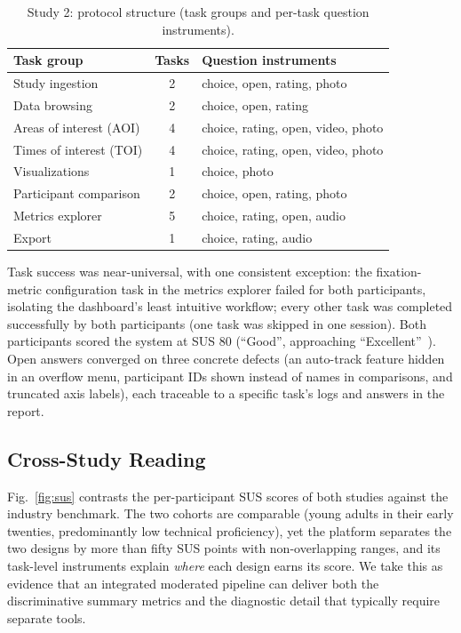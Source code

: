 \documentclass[conference]{IEEEtran}
\begin{document}
\begin{table}[t]
\caption{Study 2: protocol structure (task groups and per-task
question instruments).}
\label{tab:behold}
\centering
\footnotesize
\begin{tabular}{@{}lcl@{}}
\toprule
Task group & Tasks & Question instruments\\
\midrule
Study ingestion & 2 & choice, open, rating, photo\\
Data browsing & 2 & choice, open, rating\\
Areas of interest (AOI) & 4 & choice, rating, open, video, photo\\
Times of interest (TOI) & 4 & choice, rating, open, video, photo\\
Visualizations & 1 & choice, photo\\
Participant comparison & 2 & choice, open, rating, photo\\
Metrics explorer & 5 & choice, rating, open, audio\\
Export & 1 & choice, rating, audio\\
\bottomrule
\end{tabular}
\end{table}

Task success was near-universal, with one consistent exception: the
fixation-metric configuration task in the metrics explorer failed for
both participants, isolating the dashboard's least intuitive workflow;
every other task was completed successfully by both participants (one
task was skipped in one session). Both participants scored the system at
SUS 80 (``Good'', approaching
``Excellent''~\cite{bangor2009determining}). Open answers
converged on three concrete defects (an auto-track feature hidden in an
overflow menu, participant IDs shown instead of names in comparisons, and
truncated axis labels), each traceable to a specific task's logs and
answers in the report.

\subsection{Cross-Study Reading}
Fig.~\ref{fig:sus} contrasts the per-participant SUS scores of both
studies against the industry benchmark. The two cohorts are comparable
(young adults in their early twenties, predominantly low technical
proficiency), yet the platform separates the two designs by more than
fifty SUS points with non-overlapping ranges, and its task-level
instruments explain \emph{where} each design earns its score. We take
this as evidence that an integrated moderated pipeline can deliver both
the discriminative summary metrics and the diagnostic detail that
typically require separate tools.
\end{document}
